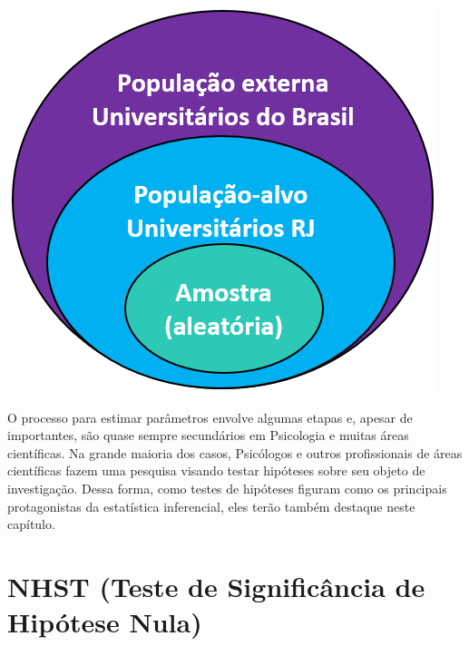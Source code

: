 \documentclass[
]{book}
\begin{document}
\includegraphics{./img/cap_inferencia_amostra_populacao.png}

O processo para estimar parâmetros envolve algumas etapas e, apesar de importantes, são quase sempre secundários em Psicologia e muitas áreas científicas. Na grande maioria dos casos, Psicólogos e outros profissionais de áreas científicas fazem uma pesquisa visando testar hipóteses sobre seu objeto de investigação. Dessa forma, como testes de hipóteses figuram como os principais protagonistas da estatística inferencial, eles terão também destaque neste capítulo.

\hypertarget{nhst-teste-de-significuxe2ncia-de-hipuxf3tese-nula}{%
\section{NHST (Teste de Significância de Hipótese Nula)}\label{nhst-teste-de-significuxe2ncia-de-hipuxf3tese-nula}}
\end{document}
